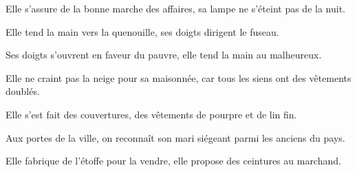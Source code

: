 
Elle s’assure de la bonne marche des affaires, sa lampe ne s’éteint pas de la nuit.

Elle tend la main vers la quenouille, ses doigts dirigent le fuseau.

Ses doigts s’ouvrent en faveur du pauvre, elle tend la main au malheureux.

Elle ne craint pas la neige pour sa maisonnée, car tous les siens ont des vêtements doublés.

Elle s’est fait des couvertures, des vêtements de pourpre et de lin fin.

Aux portes de la ville, on reconnaît son mari siégeant parmi les anciens du pays.

Elle fabrique de l’étoffe pour la vendre, elle propose des ceintures au marchand.
